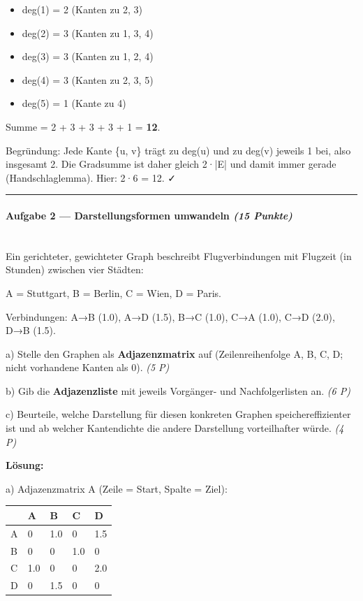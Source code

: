 \documentclass[11pt, a4paper]{article}
\begin{document}
\begin{itemize}
  \item deg(1) = 2 (Kanten zu 2, 3)
  \item deg(2) = 3 (Kanten zu 1, 3, 4)
  \item deg(3) = 3 (Kanten zu 1, 2, 4)
  \item deg(4) = 3 (Kanten zu 2, 3, 5)
  \item deg(5) = 1 (Kante zu 4)
\end{itemize}

Summe = 2 + 3 + 3 + 3 + 1 = \textbf{12}.


Begründung: Jede Kante \{u, v\} trägt zu deg(u) und zu deg(v) jeweils 1 bei, also insgesamt 2. Die Gradsumme ist daher gleich 2·|E| und damit immer gerade (Handschlaglemma). Hier: 2·6 = 12. ✓



\noindent\textcolor{rulegray}{\rule{\linewidth}{0.4pt}}


\paragraph{Aufgabe 2 — Darstellungsformen umwandeln \textit{(15 Punkte)}}\mbox{}\\[2pt]

Ein gerichteter, gewichteter Graph beschreibt Flugverbindungen mit Flugzeit (in Stunden) zwischen vier Städten:

A = Stuttgart, B = Berlin, C = Wien, D = Paris.


Verbindungen: A→B (1.0), A→D (1.5), B→C (1.0), C→A (1.0), C→D (2.0), D→B (1.5).


a) Stelle den Graphen als \textbf{Adjazenzmatrix} auf (Zeilenreihenfolge A, B, C, D; nicht vorhandene Kanten als 0). \textit{(5 P)}


b) Gib die \textbf{Adjazenzliste} mit jeweils Vorgänger- und Nachfolgerlisten an. \textit{(6 P)}


c) Beurteile, welche Darstellung für diesen konkreten Graphen speichereffizienter ist und ab welcher Kantendichte die andere Darstellung vorteilhafter würde. \textit{(4 P)}


\textbf{Lösung:}


a) Adjazenzmatrix A (Zeile = Start, Spalte = Ziel):



{\small
\begin{tabularx}{\linewidth}{XXXXX}
\hline
\rowcolor{tableheadbg}
{\color{white}\textbf{}} & {\color{white}\textbf{A}} & {\color{white}\textbf{B}} & {\color{white}\textbf{C}} & {\color{white}\textbf{D}} \\[2pt]
\hline
\endhead
\hline
\endfoot
A & 0 & 1.0 & 0 & 1.5 \\
B & 0 & 0 & 1.0 & 0 \\
C & 1.0 & 0 & 0 & 2.0 \\
D & 0 & 1.5 & 0 & 0 \\
\end{tabularx}
}
\end{document}
